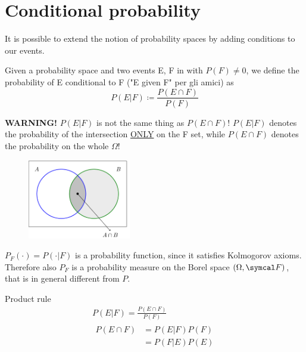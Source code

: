 \section{Conditional probability}
It is possible to extend the notion of probability spaces by adding conditions to our events.
\begin{definition}
    Given a probability space \probspace{} and two events E, F in \eff{} with $P(F) \neq 0$, we define the probability of E conditional to F ("E given F" per gli amici) as
    \begin{equation*}
        P(E|F) \coloneqq \frac{P(E \cap F)}{P(F)}
    \end{equation*}
\end{definition}
\textbf{WARNING!} $P(E|F)$ is not the same thing as $P(E \cap F)$! $P(E|F)$ denotes the probability of the intersection \underline{ONLY} on the F set, while $P(E \cap F)$ denotes the probability on the whole $\Omega$!
\begin{figure}[ht]
    \centering
    \includegraphics[width=0.4\textwidth]{images/conditional_b.png}
\end{figure}
\begin{remark}
    $P_F(\cdot) = P(\cdot{} | F) $ is a probability function, since it satisfies Kolmogorov axioms. Therefore also $P_F$ is a probability measure on the Borel space $(\Omega, \eff)$, that is in general different from $P$.
\end{remark}
\begin{remark}
    Product rule
    \begin{equation*}
    \begin{gathered}
        P(E|F)=\frac{P(E \cap F)}{P(F)}\\
            \begin{aligned}
                P(E \cap F) & = P(E|F)P(F)\\
                & = P(F|E)P(E)
            \end{aligned}
    \end{gathered}
    \end{equation*}
\end{remark}
